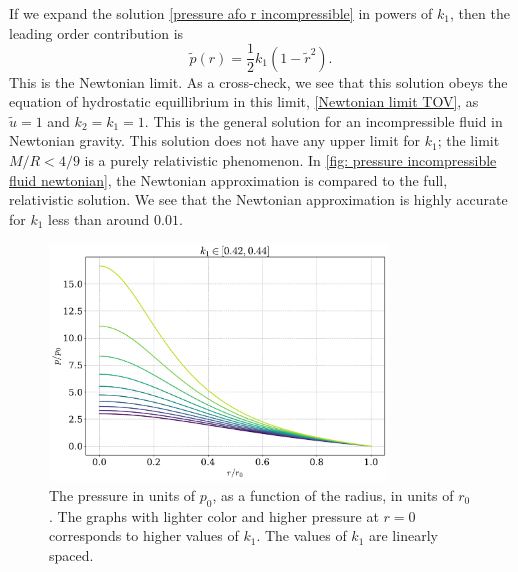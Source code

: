 If we expand the solution \autoref{pressure afo r incompressible} in powers of $k_1$, then the leading order contribution is
%
\begin{equation}
    \tilde p(r) = \frac{1}{2} k_1 (1 - \tilde r^2).
\end{equation}
%
This is the Newtonian limit.
As a cross-check, we see that this solution obeys the equation of hydrostatic equillibrium in this limit, \autoref{Newtonian limit TOV}, as $\tilde u = 1$ and $k_2 = k_1 = 1$.
This is the general solution for an incompressible fluid in Newtonian gravity.
This solution does not have any upper limit for $k_1$; the limit $M/R < 4 / 9$ is a purely relativistic phenomenon.
In \autoref{fig: pressure incompressible fluid newtonian}, the Newtonian approximation is compared to the full, relativistic solution.
We see that the Newtonian approximation is highly accurate for $k_1$ less than around $0.01$.


\begin{figure}[h]
    \centering
    \includegraphics[width=0.8\textwidth]{../scripts/figurer/incompressible.pdf}
    \caption{The pressure in units of $p_0$, as a function of the radius, in units of $r_0$. The graphs with lighter color and higher pressure at $r = 0$ corresponds to higher values of $k_1$. The values of $k_1$ are linearly spaced.}
    \label{fig: pressure incompressible fluid}
\end{figure}

